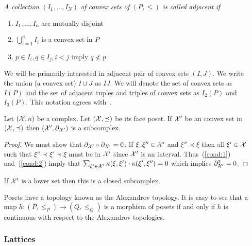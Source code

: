 \begin{defn}
{\em
A collection $(I_1,\ldots, I_N)$ of convex sets of $(P,\leq)$ is called {\em adjacent} if
\begin{enumerate}
\item $I_1,\ldots,I_n$ are mutually disjoint
\item $\bigcup_{i=1}^n I_i$ is a convex set in $P$
\item $p\in I_i, q\in I_j, i < j$ imply $q \nless p$
\end{enumerate}
}
\end{defn}

We will be primarily interested in adjacent pair of convex sets $(I,J)$.  We write the union (a convex set) $I\cup J$ as $IJ$.  We will denote the set of convex sets as $I(P)$ and the set of adjacent tuples and triples of convex sets as $I_2(P)$ and $I_3(P)$.  This notation agrees with~\cite{fran}.

\begin{prop}\label{prop:subcomplex}
Let $({\mathcal X},\kappa)$ be a complex.  Let $({\mathcal X},\preceq)$ be its face poset.  If ${\mathcal X}'$ be an convex set in $({\mathcal X},\preceq)$ then $({\mathcal X}',\partial_{{\mathcal X}'})$ is a subcomplex.
\end{prop}
\begin{proof}
We must show that $\partial_{{\mathcal X}'}\circ \partial_{{\mathcal X}'}=0$.  If $\xi,\xi''\in {\mathcal X}'$ and $\xi'' \prec \xi$ then all $\xi'\in {\mathcal X}$ such that $\xi'' \prec \xi' \prec \xi$ must be in ${\mathcal X}'$ since ${\mathcal X}'$ is an interval.  Thus~(\ref{cond:1}) and~(\ref{cond:2}) imply that $\sum_{\xi'\in {\mathcal X}'} \kappa(\xi, \xi')\cdot \kappa(\xi',\xi'')=0$ which implies $\partial_{{\mathcal X}'}^2=0$.
\end{proof}

\begin{cor}\label{cor:clsubcomplex}

If ${\mathcal X}'$ is a lower set then this is a closed subcomplex.

\end{cor}

Posets have a topology known as the Alexandrov topology.  It is easy to see that a map $h:(P,\leq_P)\to (Q,\leq_Q)$ is a morphism of posets if and only if $h$ is continuous with respect to the Alexandrov topologies.


\subsubsection{Lattices}

